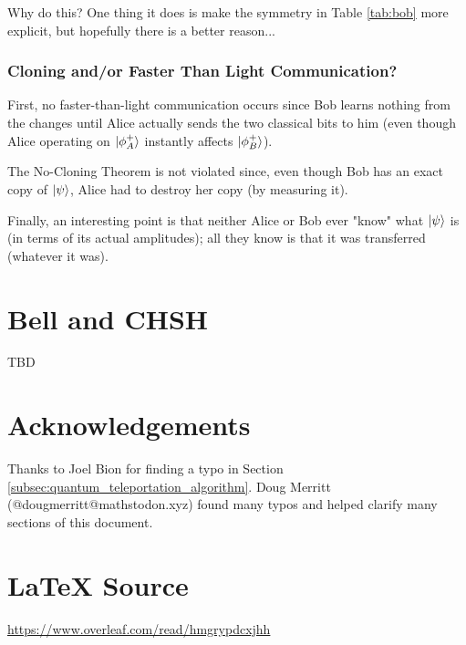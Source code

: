 \documentclass{article}
\theoremstyle{definition}
\begin{document}
\bigskip
\noindent
Why do this? One thing it does is make the symmetry in Table
\ref{tab:bob} more explicit, but hopefully there is a better
reason... 


\subsubsection{Cloning and/or Faster Than Light Communication?}
First, no faster-than-light communication occurs since Bob learns
nothing from the changes until Alice actually sends the two
classical bits to him (even though Alice operating on
$\ket{\phi^{+}_A}$ instantly affects $\ket{\phi^{+}_B}$).

\bigskip
\noindent
The No-Cloning Theorem \cite{2018arXiv180804213E} is not violated
since, even though Bob has an exact copy of $\ket{\psi}$, Alice
had to destroy her copy (by measuring it).

\bigskip
\noindent
Finally, an interesting point is that neither Alice or Bob ever
"know" what $\ket{\psi}$ is (in terms of its actual amplitudes);
all they know is that it was transferred (whatever it was).
%
%
%
\section{Bell and  CHSH}
TBD
%
%
%
\section*{Acknowledgements}
Thanks to Joel Bion for finding a typo in
Section \ref{subsec:quantum_teleportation_algorithm}.
Doug Merritt (@dougmerritt@mathstodon.xyz) found
many typos and helped clarify many sections of
this document.
%
%
\section*{\LaTeX \hspace{0.10 mm} Source}
\url{https://www.overleaf.com/read/hmgrypdcxjhh}
%
%
%


%
%
\end{document}
